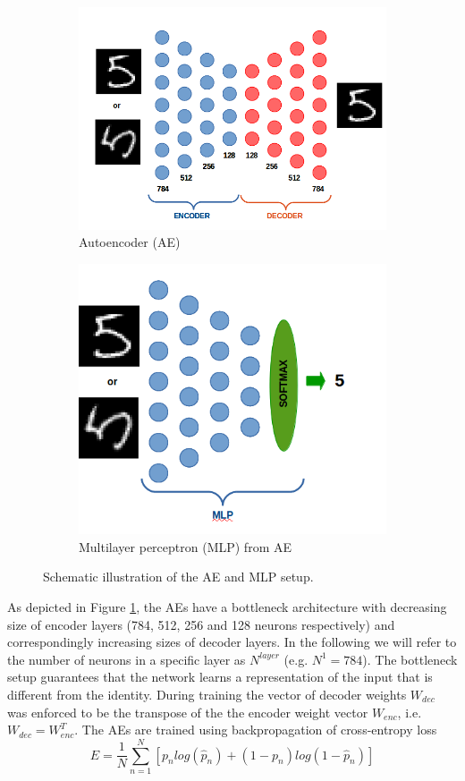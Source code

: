 \documentclass[10pt,a4paper]{article}
\begin{document}
\begin{figure}[h]
\centering
\begin{subfigure}{.5\textwidth}
  \centering
  \includegraphics[width=.8\linewidth]{enc_dec_mnist.png}
  \caption{\footnotesize{Autoencoder (AE)}}
  \label{fig:AE}
\end{subfigure}%
\begin{subfigure}{.5\textwidth}
  \centering
  \includegraphics[width=.65\linewidth]{mlp_mnist.png}
  \caption{\footnotesize{Multilayer perceptron (MLP) from AE}}
  \label{fig:MLP}
\end{subfigure}
\caption{\footnotesize{Schematic illustration of the AE and MLP setup.}}
\label{fig:AE_and_MLP}
\end{figure}

\noindent As depicted in Figure \ref{fig:AE}, the AEs have a bottleneck architecture with decreasing size of encoder layers (784, 512, 256 and 128 neurons respectively) and correspondingly increasing sizes of decoder layers. In the following we will refer to the number of neurons in a specific layer as $N^{layer}$ (e.g. $N^1 = 784$). The bottleneck setup guarantees that the network learns a representation of the input that is different from the identity. During training the vector of decoder weights $W_{dec}$ was enforced to be the transpose of the the encoder weight vector $W_{enc}$, i.e. $W_{dec} = W_{enc}^T$. 
The AEs are trained using backpropagation of cross-entropy loss
        \begin{displaymath}
        E = \frac{1}{N}\sum_{n=1}^{N}[p_n log(\hat{p}_n) + (1 - p_n)log(1 - \hat{p}_n)]
        \end{displaymath}
        
\end{document}

